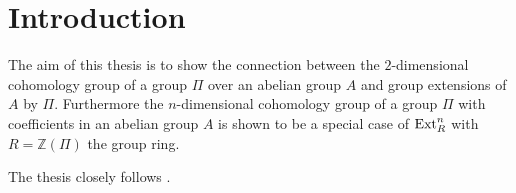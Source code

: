\section{Introduction}
The aim of this thesis is to show the connection between the $2$-dimensional cohomology group of a group $\Pi$ over an abelian group $A$ and group extensions of $A$ by $\Pi$.
Furthermore the $n$-dimensional cohomology group of a group $\Pi$ with coefficients in an abelian group $A$ is shown to be a special case of $\operatorname{Ext}^{n}_R$ with $R=\mathbb{Z}(\Pi)$ the group ring.

The thesis closely follows \textcite{maclane}.